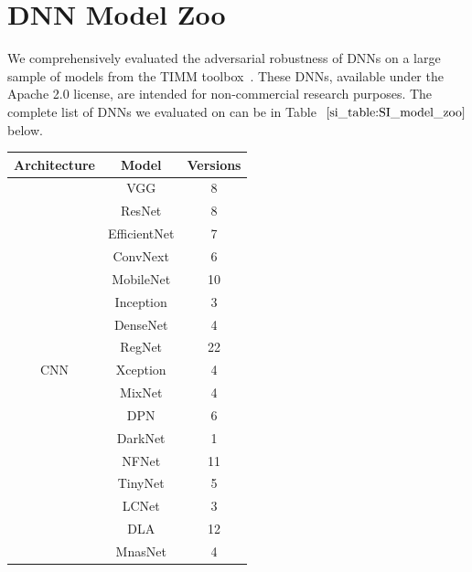 \documentclass{article}
\theoremstyle{plain}
\theoremstyle{definition}
\theoremstyle{remark}
\begin{document}
\appendix

\section{DNN Model Zoo}\label{si_sec:dnn_model_zoo}
We comprehensively evaluated the adversarial robustness of DNNs on a large sample of models from the TIMM toolbox~\cite{rw2019timm}. These DNNs, available under the Apache 2.0 license, are intended for non-commercial research purposes. The complete list of DNNs we evaluated on can be in Table $~\ref{si_table:SI_model_zoo}$ below.


\begin{table}[h]
\centering
\begin{tabular}{ccc} 
\hline 
\textbf{Architecture}           & \textbf{Model} & \textbf{Versions}  \\ 
\hline
\multirow{18}{*}{CNN}   & VGG               & 8                \\
                        & ResNet            & 8                \\
                        & EfficientNet      & 7                \\
                        & ConvNext          & 6                \\
                        & MobileNet         & 10               \\
                        & Inception         & 3                \\
                        & DenseNet          & 4                \\
                        & RegNet            & 22               \\
                        & Xception          & 4                \\
                        & MixNet            & 4                \\
                        & DPN               & 6                \\
                        & DarkNet           & 1                \\
                        & NFNet             & 11               \\
                        & TinyNet           & 5                \\
                        & LCNet             & 3                \\
                        & DLA               & 12               \\
                        & MnasNet           & 4                \\

\end{tabular}
\end{table}
\end{document}
